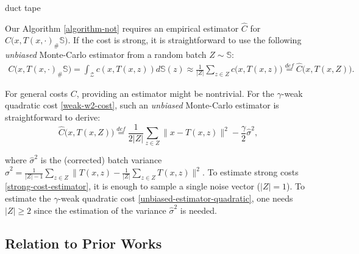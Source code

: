 \documentclass{article} %
\begin{document}
{\color{white}duct tape}
\vspace{-12mm}

Our Algorithm \ref{algorithm-not} requires an empirical estimator $\widehat{C}$ for $C\big(x,T(x,\cdot)_{\#}\mathbb{S}\big)$. If the cost is strong, it is straightforward to use the following \textit{unbiased} Monte-Carlo estimator from a random batch $Z\sim\mathbb{S}$: 
\begin{eqnarray}
C\big(x,T(x,\cdot)_{\#}\mathbb{S}\big)=\int_{\mathcal{Z}}c(x,T(x,z))d\mathbb{S}(z)\approx
\frac{1}{|Z|}\sum_{z\in Z}c\big(x,T(x,z)\big)\stackrel{def}{=}\widehat{C}\big(x,T(x,Z)\big).
\label{strong-cost-estimator}
\end{eqnarray}

\vspace{-3.5mm}For general costs $C$, providing an estimator might be nontrivial. For the $\gamma$-weak quadratic cost \eqref{weak-w2-cost}, such an \textit{unbiased} Monte-Carlo estimator is straightforward to derive:
\begin{equation}
\widehat{C}\big(x,T(x,Z)\big)\stackrel{def}{=}\frac{1}{2|Z|}\sum_{z\in Z}\|x-T(x,z)\|^{2}-\frac{\gamma}{2}\hat{\sigma}^{2},
\label{unbiased-estimator-quadratic}
\end{equation}

\vspace{-3mm}where $\hat{\sigma}^{2}$ is the (corrected) batch variance  $\hat{\sigma}^{2}=\frac{1}{|Z|-1}\sum_{z\in Z}\|T(x,z)-\frac{1}{|Z|}\sum_{z\in Z}T(x,z)\|^{2}.$
To estimate strong costs \eqref{strong-cost-estimator}, it is enough to sample a single noise vector ($|Z|=1$). To estimate the $\gamma$-weak quadratic cost \eqref{unbiased-estimator-quadratic}, one needs $|Z|\geq 2$ since the estimation of the variance $\hat{\sigma}^{2}$ is needed.

\vspace{-2.5mm}
\subsection{Relation to Prior Works}
\label{sec-relation-to-prior}
\end{document}
